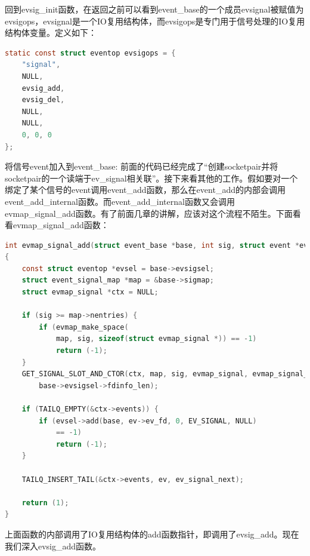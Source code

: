 \documentclass[11pt,a4paper]{article}
\begin{document}
回到evsig\_init函数，在返回之前可以看到event\_base的一个成员evsignal被赋值为evsigops，evsignal是一个IO复用结构体，而evsigops是专门用于信号处理的IO复用结构体变量。定义如下：
\begin{lstlisting}[language=C]
static const struct eventop evsigops = {
	"signal",
	NULL,
	evsig_add,
	evsig_del,
	NULL,
	NULL,
	0, 0, 0
};
\end{lstlisting}
将信号event加入到event\_base:
前面的代码已经完成了“创建socketpair并将socketpair的一个读端于ev\_signal相关联”。接下来看其他的工作。假如要对一个绑定了某个信号的event调用event\_add函数，那么在event\_add的内部会调用event\_add\_internal函数。而event\_add\_internal函数又会调用evmap\_signal\_add函数。有了前面几章的讲解，应该对这个流程不陌生。下面看看evmap\_signal\_add函数：
\begin{lstlisting}[language=C]
int evmap_signal_add(struct event_base *base, int sig, struct event *ev)
{
	const struct eventop *evsel = base->evsigsel;
	struct event_signal_map *map = &base->sigmap;
	struct evmap_signal *ctx = NULL;

	if (sig >= map->nentries) {
		if (evmap_make_space(
			map, sig, sizeof(struct evmap_signal *)) == -1)
			return (-1);
	}
	GET_SIGNAL_SLOT_AND_CTOR(ctx, map, sig, evmap_signal, evmap_signal_init,
	    base->evsigsel->fdinfo_len);

	if (TAILQ_EMPTY(&ctx->events)) {
		if (evsel->add(base, ev->ev_fd, 0, EV_SIGNAL, NULL)
		    == -1)
			return (-1);
	}

	TAILQ_INSERT_TAIL(&ctx->events, ev, ev_signal_next);

	return (1);
}
\end{lstlisting}
上面函数的内部调用了IO复用结构体的add函数指针，即调用了evsig\_add。现在我们深入evsig\_add函数。
\end{document}
